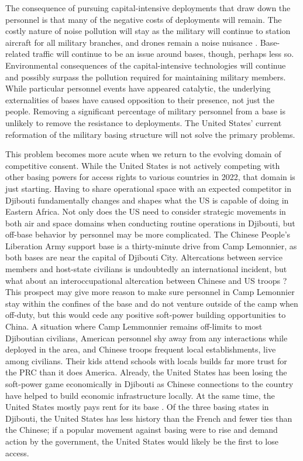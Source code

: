 The consequence of pursuing capital-intensive deployments that draw down the personnel is that many of the negative costs of deployments will remain. The costly nature of noise pollution will stay as the military will continue to station aircraft for all military branches, and drones remain a noise nuisance \cite{Schaffer2021}. Base-related traffic will continue to be an issue around bases, though, perhaps less so. Environmental consequences of the capital-intensive technologies will continue and possibly surpass the pollution required for maintaining military members. While particular personnel events have appeared catalytic, the underlying externalities of bases have caused opposition to their presence, not just the people. Removing a significant percentage of military personnel from a base is unlikely to remove the resistance to deployments. The United States' current reformation of the military basing structure will not solve the primary problems.


This problem becomes more acute when we return to the evolving domain of competitive consent. While the United States is not actively competing with other basing powers for access rights to various countries in 2022, that domain is just starting. Having to share operational space with an expected competitor in Djibouti fundamentally changes and shapes what the US is capable of doing in Eastern Africa. Not only does the US need to consider strategic movements in both air and space domains when conducting routine operations in Djibouti, but off-base behavior by personnel may be more complicated. The Chinese People's Liberation Army support base is a thirty-minute drive from Camp Lemonnier, as both bases are near the capital of Djibouti City. Altercations between service members and host-state civilians is undoubtedly an international incident, but what about an interoccupational altercation between Chinese and US troops \cite{Bryant1979}? This prospect may give more reason to make sure personnel in Camp Lemonnier stay within the confines of the base and do not venture outside of the camp when off-duty, but this would cede any positive soft-power building opportunities to China. A situation where Camp Lemmonnier remains off-limits to most Djiboutian civilians, American personnel shy away from any interactions while deployed in the area, and Chinese troops frequent local establishments, live among civilians. Their kids attend schools with locals builds far more trust for the PRC than it does America. Already, the United States has been losing the soft-power game economically in Djibouti as Chinese connections to the country have helped to build economic infrastructure locally. At the same time, the United States mostly pays rent for its base \cite{Bearak2019}. Of the three basing states in Djibouti, the United States has less history than the French and fewer ties than the Chinese; if a popular movement against basing were to rise and demand action by the government, the United States would likely be the first to lose access.

